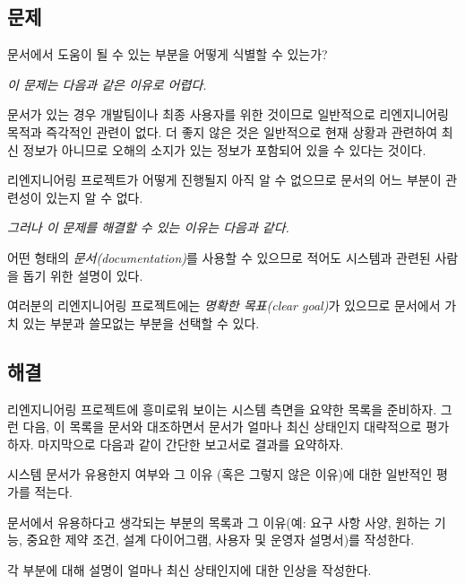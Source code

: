 \documentclass[a4paper,10pt,twoside]{book}
\begin{document}
\subsection*{문제}

문서에서 도움이 될 수 있는 부분을 어떻게 식별할 수 있는가?

\emph{이 문제는 다음과 같은 이유로 어렵다.}

\begin{bulletlist}
  \item 문서가 있는 경우 개발팀이나 최종 사용자를 위한 것이므로 일반적으로 리엔지니어링 목적과 즉각적인 관련이 없다. 더 좋지 않은 것은 일반적으로 현재 상황과 관련하여 최신 정보가 아니므로 오해의 소지가 있는 정보가 포함되어 있을 수 있다는 것이다.

  \item 리엔지니어링 프로젝트가 어떻게 진행될지 아직 알 수 없으므로 문서의 어느 부분이 관련성이 있는지 알 수 없다.
\end{bulletlist}


\emph{그러나 이 문제를 해결할 수 있는 이유는 다음과 같다.}

\begin{bulletlist}
  \item 어떤 형태의 \emph{문서(documentation)}를 사용할 수 있으므로 적어도 시스템과 관련된 사람을 돕기 위한 설명이 있다.

  \item 여러분의 리엔지니어링 프로젝트에는 \emph{명확한 목표(clear goal)}가 있으므로 문서에서 가치 있는 부분과 쓸모없는 부분을 선택할 수 있다.

\end{bulletlist}

\subsection*{해결}

리엔지니어링 프로젝트에 흥미로워 보이는 시스템 측면을 요약한 목록을 준비하자. 그런 다음, 이 목록을 문서와 대조하면서 문서가 얼마나 최신 상태인지 대략적으로 평가하자. 마지막으로 다음과 같이 간단한 보고서로 결과를 요약하자.

\begin{bulletlist}
  \item 시스템 문서가 유용한지 여부와 그 이유 (혹은 그렇지 않은 이유)에 대한 일반적인 평가를 적는다.

  \item 문서에서 유용하다고 생각되는 부분의 목록과 그 이유(예: 요구 사항 사양, 원하는 기능, 중요한 제약 조건, 설계 다이어그램, 사용자 및 운영자 설명서)를 작성한다.

  \item 각 부분에 대해 설명이 얼마나 최신 상태인지에 대한 인상을 작성한다.
\end{bulletlist}
\end{document}

